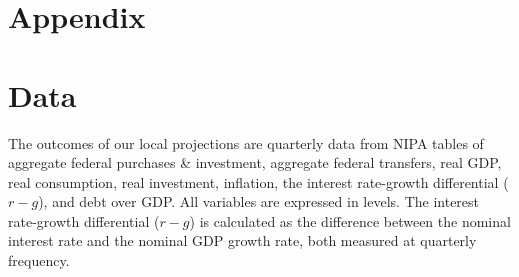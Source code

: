 \documentclass[12pt]{article}%
\theoremstyle{remark}
\begin{document}




\singlespacing
  


\appendix
\doublespace

 
\section*{Appendix}
\section{Data}

The outcomes of our local projections are quarterly data from NIPA tables of aggregate federal purchases \& investment, aggregate federal transfers, real GDP, real consumption, real investment, inflation, the interest rate-growth differential ($r-g$), and debt over GDP. All variables are expressed in levels. The interest rate-growth differential ($r-g$) is calculated as the difference between the nominal interest rate and the nominal GDP growth rate, both measured at quarterly frequency.
\end{document}
